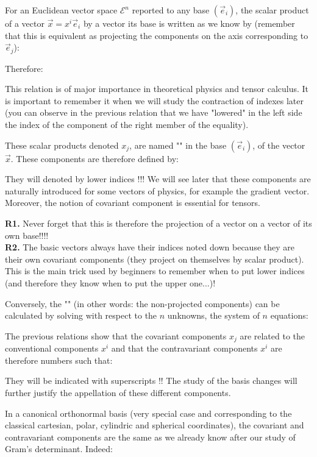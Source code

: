 	For an Euclidean vector space $\mathcal{E}^n$ reported to any base $(\vec{e}_i)$, the scalar product of a vector $\vec{x}=x^i\vec{e}_i$ by a vector its base is written as we know by (remember that this is equivalent as projecting the components on the axis corresponding to $\vec{e}_j$):
	
	Therefore:
	
	This relation is of major importance in theoretical physics and tensor calculus. It is important to remember it when we will study the contraction of indexes later (you can observe in the previous relation that we have "lowered" in the left side the index of the component of the right member of the equality).
	
	These scalar products denoted $x_j$, are named "" in the base $(\vec{e}_i)$, of the vector $\vec{x}$. These components are therefore defined by:
	
	They will denoted by lower indices !!! We will see later that these components are naturally introduced for some vectors of physics, for example the gradient vector. Moreover, the notion of covariant component is essential for tensors.
	
	\begin{tcolorbox}[title=Remarks,colframe=black,arc=10pt]
	\textbf{R1.} Never forget that this is therefore the projection of a vector on a vector of its own base!!!!\\
	
	\textbf{R2.} The basic vectors always have their indices noted down because they are their own covariant components (they project on themselves by scalar product). This is the main trick used by beginners to remember when to put lower indices (and therefore they know when to put the upper one...)!
	\end{tcolorbox}
	Conversely, the "" (in other words: the non-projected components) can be calculated by solving with respect to the $n$ unknowns, the system of $n$ equations:
	
	The previous relations show that the covariant components $x_j$ are related to the conventional components $x^i$ and that the contravariant components $x^i$ are therefore numbers such that:
	
	They will be indicated with superscripts !! The study of the basis changes will further justify the appellation of these different components.
	
	In a canonical orthonormal basis (very special case and corresponding to the classical cartesian, polar, cylindric and spherical coordinates), the covariant and contravariant components are the same as we already know after our study of Gram's determinant. Indeed:
	
